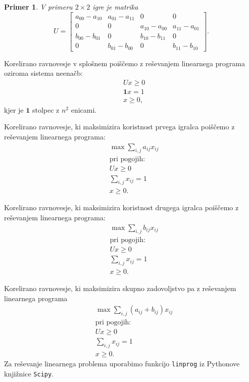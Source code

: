 \documentclass{article}
\newtheorem{example}{Primer}
\begin{document}
\begin{example}
    V primeru $2\times 2$ igre je matrika
    $$ U = \begin{bmatrix}
        a_{00} - a_{10} & a_{01} - a_{11} & 0 & 0\\
        0 & 0 & a_{10} - a_{00} & a_{11} - a_{01} \\
        b_{00} - b_{01} & 0 & b_{10} - b_{11} & 0 \\
        0 & b_{01} - b_{00} & 0 & b_{11} - b_{10}
        \end{bmatrix}. $$
\end{example}

Korelirano ravnovesje v splošnem poiščemo z reševanjem linearnega programa oziroma sistema neenačb:
\begin{align*}
    & U x \geq 0 \\
    &\mathbf{1}x = 1 \\
    &x \geq 0,
\end{align*}
kjer je $\mathbf{1}$ stolpec z $n^2$ enicami. 

Korelirano ravnovesje, ki maksimizira koristnost prvega igralca poiščemo z reševanjem linearnega programa:
    \begin{align*}
        &\max \sum_{i,j} a_{ij} x_{ij} \\
        &\text{pri pogojih:} \\
        & U x \geq 0 \\
        & \sum_{i,j} x_{ij} = 1 \\
        & x \geq 0.
    \end{align*}

Korelirano ravnovesje, ki maksimizira koristnost drugega igralca poiščemo z reševanjem linearnega programa:
    \begin{align*}
        & \max \sum_{i,j} b_{ij} x_{ij} \\
        & \text{pri pogojih:} \\
        & U x \geq 0 \\
        & \sum_{i,j} x_{ij} = 1 \\
        & x \geq 0.
    \end{align*}

Korelirano ravnovesje, ki maksimizira skupno zadovoljstvo pa z reševanjem linearnega programa
    \begin{align*}
        &\max \sum_{i,j} (a_{ij} + b_{ij}) x_{ij} \\
        &\text{pri pogojih:} \\
        & U x \geq 0 \\
        & \sum_{i,j} x_{ij} = 1  \\
        & x \geq 0.
    \end{align*}
Za reševanje linearnega problema uporabimo funkcijo \texttt{linprog} iz Pythonove knjižnice \texttt{Scipy}. 
\end{document}
